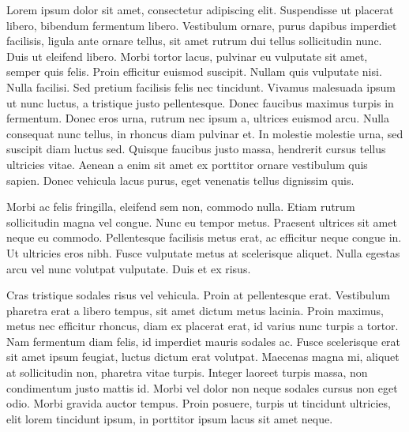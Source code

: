  Lorem ipsum dolor sit amet, consectetur adipiscing elit. Suspendisse ut placerat libero, bibendum fermentum libero. Vestibulum ornare, purus dapibus imperdiet facilisis, ligula ante ornare tellus, sit amet rutrum dui tellus sollicitudin nunc. Duis ut eleifend libero. Morbi tortor lacus, pulvinar eu vulputate sit amet, semper quis felis. Proin efficitur euismod suscipit. Nullam quis vulputate nisi. Nulla facilisi. Sed pretium facilisis felis nec tincidunt. Vivamus malesuada ipsum ut nunc luctus, a tristique justo pellentesque. Donec faucibus maximus turpis in fermentum. Donec eros urna, rutrum nec ipsum a, ultrices euismod arcu. Nulla consequat nunc tellus, in rhoncus diam pulvinar et. In molestie molestie urna, sed suscipit diam luctus sed. Quisque faucibus justo massa, hendrerit cursus tellus ultricies vitae. Aenean a enim sit amet ex porttitor ornare vestibulum quis sapien. Donec vehicula lacus purus, eget venenatis tellus dignissim quis.

Morbi ac felis fringilla, eleifend sem non, commodo nulla. Etiam rutrum sollicitudin magna vel congue. Nunc eu tempor metus. Praesent ultrices sit amet neque eu commodo. Pellentesque facilisis metus erat, ac efficitur neque congue in. Ut ultricies eros nibh. Fusce vulputate metus at scelerisque aliquet. Nulla egestas arcu vel nunc volutpat vulputate. Duis et ex risus.

Cras tristique sodales risus vel vehicula. Proin at pellentesque erat. Vestibulum pharetra erat a libero tempus, sit amet dictum metus lacinia. Proin maximus, metus nec efficitur rhoncus, diam ex placerat erat, id varius nunc turpis a tortor. Nam fermentum diam felis, id imperdiet mauris sodales ac. Fusce scelerisque erat sit amet ipsum feugiat, luctus dictum erat volutpat. Maecenas magna mi, aliquet at sollicitudin non, pharetra vitae turpis. Integer laoreet turpis massa, non condimentum justo mattis id. Morbi vel dolor non neque sodales cursus non eget odio. Morbi gravida auctor tempus. Proin posuere, turpis ut tincidunt ultricies, elit lorem tincidunt ipsum, in porttitor ipsum lacus sit amet neque. 